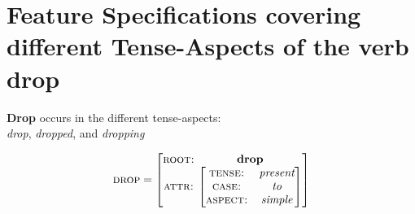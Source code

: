 \documentclass[12pt,a4paper]{article}
\begin{document}
	
	\section{Feature Specifications covering different Tense-Aspects of the verb drop}
    \textbf{Drop} occurs in the different tense-aspects:\\
    \textit{drop}, \textit{dropped}, and \textit{dropping}

\[
\textsc{drop}=
\begin{bmatrix}
\textsc{root:} & \mspace{-12mu} \begin{matrix} \textbf{drop} \end{matrix} \\
\begin{matrix} \textsc{attr:} \end{matrix} &
\mspace{-12mu}
\begin{bmatrix}
  \textsc{tense:} & \textit{present}\\
  \textsc{case:} & \textit{to}\\
  \textsc{aspect:} & \textit{simple}\\
\end{bmatrix}
\end{bmatrix}
\]\\
\end{document}
